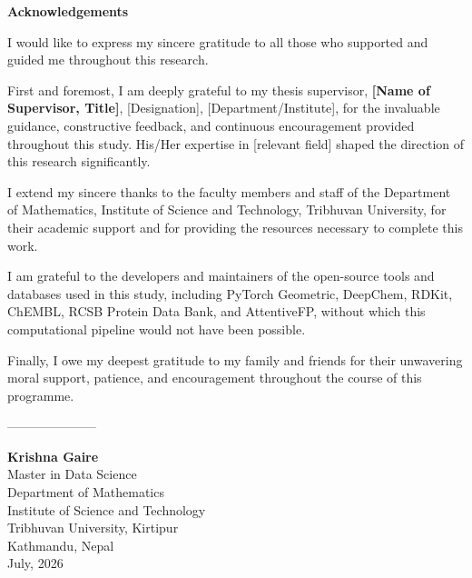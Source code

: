 
\cleardoublepage
{}
{}
\thispagestyle{plain}

\begin{center}
{\fontsize{16}{20}\selectfont\textbf{Acknowledgements}}
\end{center}

\vspace{0.5cm}

\begin{onehalfspace}

\noindent
I would like to express my sincere gratitude to all those who
supported and guided me throughout this research.

\vspace{0.3cm}

\noindent
First and foremost, I am deeply grateful to my thesis supervisor,
\textbf{[Name of Supervisor, Title]}, [Designation],
[Department/Institute], for the invaluable guidance, constructive
feedback, and continuous encouragement provided throughout this
study. His/Her expertise in [relevant field] shaped the direction
of this research significantly.

\vspace{0.3cm}

\noindent
I extend my sincere thanks to the faculty members and staff of the
Department of Mathematics, Institute of Science and Technology,
Tribhuvan University, for their academic support and for providing
the resources necessary to complete this work.

\vspace{0.3cm}

\noindent
I am grateful to the developers and maintainers of the open-source
tools and databases used in this study, including PyTorch Geometric,
DeepChem, RDKit, ChEMBL, RCSB Protein Data Bank, and AttentiveFP,
without which this computational pipeline would not have been
possible.

\vspace{0.3cm}

\noindent
Finally, I owe my deepest gratitude to my family and friends for
their unwavering moral support, patience, and encouragement
throughout the course of this programme.

\end{onehalfspace}

\vspace{1.5cm}

\noindent
---------------------

\vspace{0.3cm}

\noindent
\textbf{Krishna Gaire}\\[0.2cm]
Master in Data Science\\
Department of Mathematics\\
Institute of Science and Technology\\
Tribhuvan University, Kirtipur\\
Kathmandu, Nepal\\
July, 2026